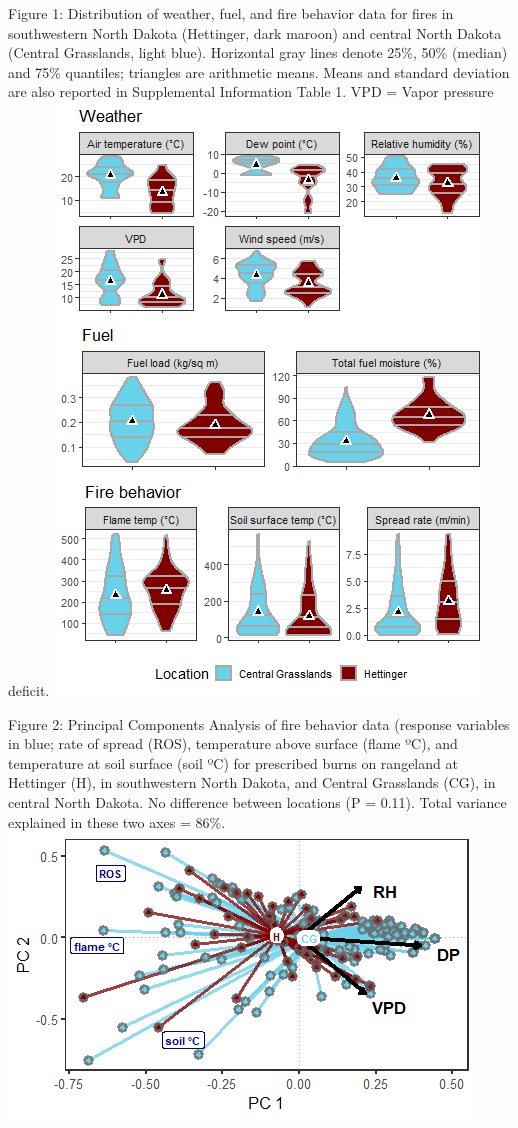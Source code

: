 \documentclass[
]{article}
\begin{document}
Figure 1: Distribution of weather, fuel, and fire behavior data for
fires in southwestern North Dakota (Hettinger, dark maroon) and central
North Dakota (Central Grasslands, light blue). Horizontal gray lines
denote 25\%, 50\% (median) and 75\% quantiles; triangles are arithmetic
means. Means and standard deviation are also reported in Supplemental
Information Table 1. VPD = Vapor pressure deficit.
\includegraphics{./springer/data_summary_gg-1.png}

\newpage

Figure 2: Principal Components Analysis of fire behavior data (response
variables in blue; rate of spread (ROS), temperature above surface
(flame ºC), and temperature at soil surface (soil ºC) for prescribed
burns on rangeland at Hettinger (H), in southwestern North Dakota, and
Central Grasslands (CG), in central North Dakota. No difference between
locations (P = 0.11). Total variance explained in these two axes = 86\%.
\includegraphics{./springer/pca_gg-1.png}
\end{document}
